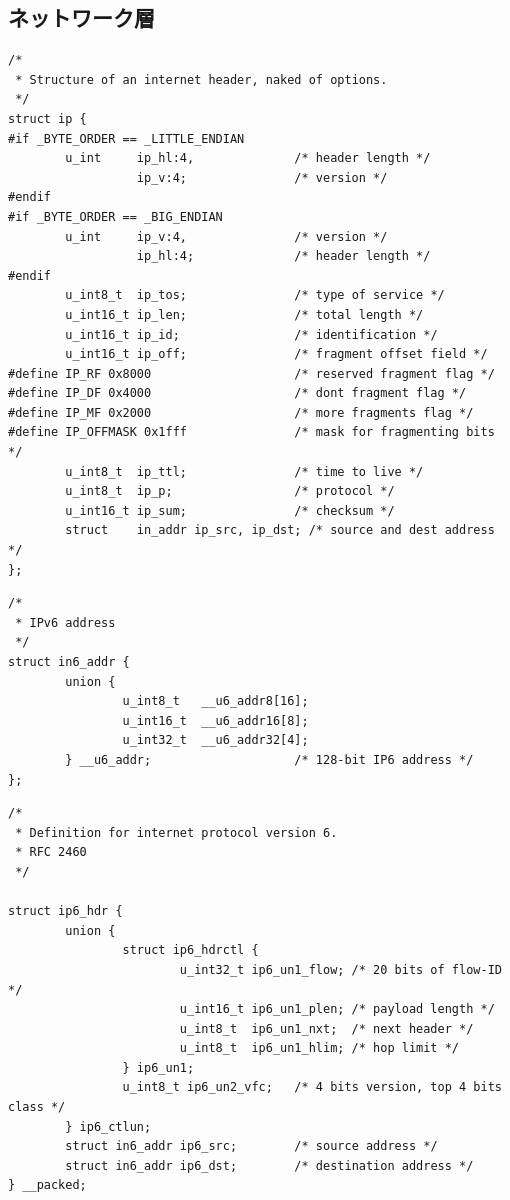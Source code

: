 \subsection{ネットワーク層} \label{sec:network}

\begin{lstlisting}[caption=IPv4ヘッダ定義 (/usr/include/netinet/ip.h),label=src:ip.h]
/*
 * Structure of an internet header, naked of options.
 */
struct ip {
#if _BYTE_ORDER == _LITTLE_ENDIAN
        u_int     ip_hl:4,              /* header length */
                  ip_v:4;               /* version */
#endif
#if _BYTE_ORDER == _BIG_ENDIAN
        u_int     ip_v:4,               /* version */
                  ip_hl:4;              /* header length */
#endif
        u_int8_t  ip_tos;               /* type of service */
        u_int16_t ip_len;               /* total length */
        u_int16_t ip_id;                /* identification */
        u_int16_t ip_off;               /* fragment offset field */
#define IP_RF 0x8000                    /* reserved fragment flag */
#define IP_DF 0x4000                    /* dont fragment flag */
#define IP_MF 0x2000                    /* more fragments flag */
#define IP_OFFMASK 0x1fff               /* mask for fragmenting bits */
        u_int8_t  ip_ttl;               /* time to live */
        u_int8_t  ip_p;                 /* protocol */
        u_int16_t ip_sum;               /* checksum */
        struct    in_addr ip_src, ip_dst; /* source and dest address */
};
\end{lstlisting}

\begin{lstlisting}[caption=IPv6アドレス構造体 (/usr/include/netinet6/in6.h),label=src:in6.h]
/*
 * IPv6 address
 */
struct in6_addr {
        union {
                u_int8_t   __u6_addr8[16];
                u_int16_t  __u6_addr16[8];
                u_int32_t  __u6_addr32[4];
        } __u6_addr;                    /* 128-bit IP6 address */
};
\end{lstlisting}

\begin{lstlisting}[caption=IPv6ヘッダ定義 (/usr/include/netinet/ip6.h),label=src:ip6.h]
/*
 * Definition for internet protocol version 6.
 * RFC 2460
 */

struct ip6_hdr {
        union {
                struct ip6_hdrctl {
                        u_int32_t ip6_un1_flow; /* 20 bits of flow-ID */
                        u_int16_t ip6_un1_plen; /* payload length */
                        u_int8_t  ip6_un1_nxt;  /* next header */
                        u_int8_t  ip6_un1_hlim; /* hop limit */
                } ip6_un1;
                u_int8_t ip6_un2_vfc;   /* 4 bits version, top 4 bits class */
        } ip6_ctlun;
        struct in6_addr ip6_src;        /* source address */
        struct in6_addr ip6_dst;        /* destination address */
} __packed;
\end{lstlisting}

